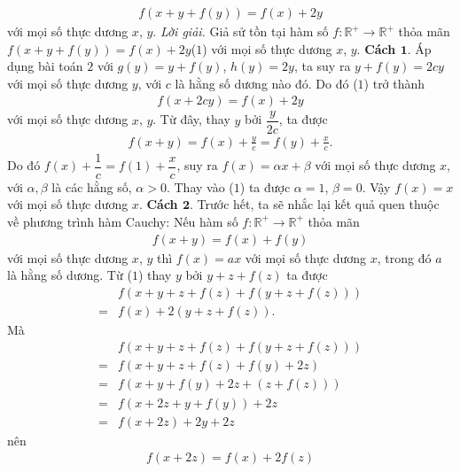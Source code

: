 \begin{multicols}{2}
\begin{align*}
		f(x+y+f(y))=f(x)+2 y
	\end{align*}
	với mọi số thực dương $x$, $y$.
	\vskip 0.1cm
	\textit{Lời giải.} Giả sử tồn tại hàm số $f:\mathbb{R^+}  \to \mathbb{R^+} $ thỏa mãn 
	$f(x+y+f(y))=f(x)+2 y $\hfill ($1$)
	\vskip 0.1cm
	với mọi số thực dương $x$, $y$.
	\vskip 0.1cm
	\textbf{\color{hoccungpi}Cách $\pmb{1.}$} 
	Áp dụng bài toán $2$ với $g(y)=y+f(y)$, $h(y)=2y$, ta suy ra
	$y + f(y) = 2cy$ với mọi số thực dương $y$, 
	với $c$ là hằng số dương nào đó. Do đó ($1$) trở thành
	\begin{align*}
		f(x + 2cy) = f(x) + 2y
	\end{align*}
	với mọi số thực dương $x$, $y$.
	Từ đây, thay $y$ bởi $\dfrac{y}{{2c}}$, ta được
	\begin{align*}
		f(x + y) = f(x) + \frac{y}{c}= f(y) + \frac{x}{c}.
	\end{align*}
	Do đó $ f(x) + \dfrac{1}{c} = f(1) + \dfrac{x}{c}$, suy ra
	$f(x) = \alpha x + \beta$ với mọi số thực dương $x$, với $\alpha ,\beta $ là các hằng số, $\alpha >0$. Thay vào ($1$) ta được
	$\alpha  = 1$, $\beta  = 0$. Vậy 
	$f(x)= x$ 	với mọi số thực dương $x$.
	\vskip 0.1cm
	\textbf{\color{hoccungpi}Cách $\pmb{2.}$} 
	Trước hết,  ta sẽ nhắc lại kết quả quen thuộc về phương trình hàm Cauchy: Nếu hàm số 	$f:\mathbb{R^+}  \to \mathbb{R^+} $ thỏa mãn 
	\begin{align*}
		f(x+y)=f(x)+f(y)
	\end{align*}
	với mọi số thực dương $x$, $y$ thì $f(x)=ax$ với mọi số thực dương $x$, trong đó $a$ là hằng số dương.
	Từ ($1$) thay $y$ bởi $y+z+f(z)$ ta được
	\begin{align*}
		&f\left( {x + y + z + f(z) + f\left( {y + z + f(z)} \right)} \right)\\
		= &f(x) + 2\left( {y + z + f(z)} \right).
	\end{align*}
	Mà
	\begin{align*}
		&f\left(x + y + z + f(z) + f\left(y+ z + f(z)\right)\right)\\
		= &f\left( {x + y + z + f(z) + f(y) + 2z} \right) \\
		=&  f\left( {x + y + f(y) + 2z + \left( {z + f(z)} \right)} \right) \\
		=&f\left( {x + 2z + y + f(y)} \right) + 2z\\
		=& f\left( {x + 2z} \right) + 2y + 2z 
	\end{align*}
	nên 
	\begin{align*}
		f\left( {x + 2z} \right) = f(x) + 2f(z)\tag{$2$}
	\end{align*}	

\end{multicols}
